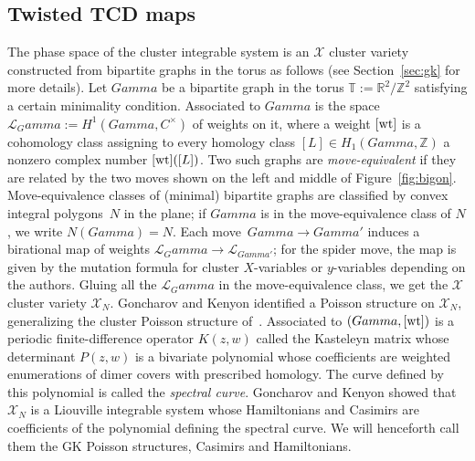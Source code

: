 \documentclass[10pt,a4paper]{amsart}
\numberwithin{equation}{section}
\newcommand{\Z}{{\mathbb Z}}
\newcommand{\R}{{\mathbb R}}
\newcommand{\C}{{\mathbb C}}
\newcommand{\T}{{\mathbb T}}
\newcommand{\ra}{\rightarrow}
\newcommand{\wt}{{\rm wt}}
\def\Gamma{Gamma}
\def\C{C}
\begin{document}
	\subsection{Twisted TCD maps}
	
	The phase space of the cluster integrable system is an $\mathcal X$ cluster variety constructed from bipartite graphs in the torus as follows (see Section~\ref{sec:gk} for more details).
	Let $\Gamma$ be a bipartite graph in the torus $\T:= \R^2/\Z^2$ satisfying a certain minimality condition. Associated to $\Gamma$ is the space $\mathcal L_\Gamma:=H^1(\Gamma,\C^\times)$ of weights on it, where a weight $[\wt]$ is a cohomology class assigning to every homology class $[L] \in H_1(\Gamma,\Z)$ a nonzero complex number $[\wt]([L])$. Two such graphs are \textit{move-equivalent} if they are related by the two moves shown on the left and middle of Figure~\ref{fig:bigon}. Move-equivalence classes of (minimal) bipartite graphs are classified by convex integral polygons~$N$ in the plane; if $\Gamma$ is in the move-equivalence class of $N$, we write $N(\Gamma)=N$. Each move~${\Gamma \ra \Gamma'}$ induces a birational map of weights $\mathcal L_\Gamma \rightarrow \mathcal L_{\Gamma'}$; for the spider move, the map is given by the mutation formula for cluster $X$-variables \cite{FG} or $y$-variables \cite{FZ} depending on the authors. Gluing all the $\mathcal L_\Gamma$ in the move-equivalence class, we get the $\mathcal X$ cluster variety $\mathcal X_N$. Goncharov and Kenyon identified a Poisson structure on $\mathcal X_N$, generalizing the cluster Poisson structure of~\cite{GSTV}. Associated to $(\Gamma,[\wt])$ is a periodic finite-difference operator $K(z,w)$ called the Kasteleyn matrix whose determinant $P(z,w)$ is a bivariate polynomial whose coefficients are weighted enumerations of dimer covers with prescribed homology. The curve defined by this polynomial is called the \textit{spectral curve}. Goncharov and Kenyon showed that $\mathcal X_N$ is a Liouville integrable system whose Hamiltonians and Casimirs are coefficients of the polynomial defining the spectral curve. We will henceforth call them the GK Poisson structures, Casimirs and Hamiltonians.
	
\end{document}
